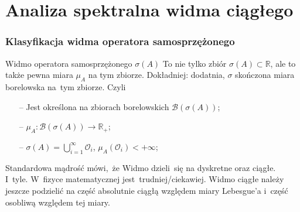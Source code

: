\documentclass{beamer} \mode<presentation>
\newcommand{\mb}{\mathbb}
\newcommand{\mc}{\mathcal}
\newcommand{\ra}{\rightarrow}
\newcommand{\si}{\sigma}
\newcommand{\R}{\mb{R}}
\newcommand{\B}{\mc{B}}
\newcommand{\Oc}{\mc{O}}
\newcommand{\Rp}{\R_{ + }}
\newcommand{\sset}{\subset}
\begin{document}
\section{Analiza spektralna widma ciągłego}



\begin{frame}
  \frametitle{Klasyfikacja widma operatora samosprzężonego}

  \begin{block}{Widmo operatora samosprzężonego $\si( A )$}
    To nie tylko zbiór $\si( A ) \sset \R$, ale to także pewna miara
    $\mu_{ A }$ na tym zbiorze. Dokładniej: dodatnia, $\si$\dywiz
    skończona miara borelowska na~tym zbiorze. Czyli
    \begin{itemize}
    \item[--] Jest określona na zbiorach borelowskich
      $\B( \si( A ) )$;
    \item[--] $\mu_{ A } : \B( \si( A ) ) \ra \Rp$;
    \item[--]
      $\si( A ) = \bigcup\limits_{ i = 1 }^{ \infty } \Oc_{ i }$,
      $\mu_{ A }( \Oc_{ i } ) < +\infty$;
    \end{itemize}
  \end{block}

  \begin{block}{Standardowa mądrość mówi,~że}
    Widmo dzieli~się na dyskretne oraz ciągłe. I~tyle. W~fizyce
    matematycznej jest~trudniej/ciekawiej. Widmo ciągłe należy jeszcze
    podzielić na część absolutnie ciągłą względem miary Lebesgue'a
    i~część osobliwą względem tej miary.
  \end{block}

\end{frame}
\end{document}
